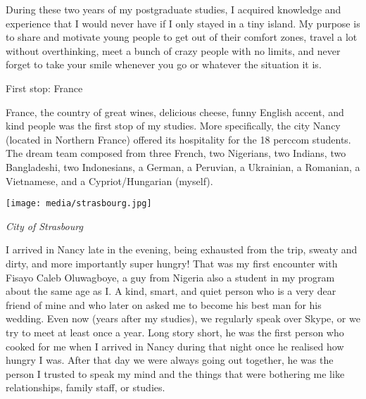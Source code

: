 \documentclass[10pt,a4paper]{article} %
\newcommand{\NewsItem}[1]{ %
\usefont{T1}{fvs}{n}{n} %
\vspace{24pt}\large #1\vspace{3pt} %
\par \normalsize \normalfont}
\begin{document}
\begin{multicols}{3}
During these two years of my postgraduate studies, I acquired knowledge and 
experience that I would never have if I only stayed in a tiny island. 
My purpose is to share and motivate young people to get out of their comfort zones, 
travel a lot without overthinking, meet a bunch of crazy people with no limits, 
and never forget to take your smile whenever you go or whatever the situation it is.

\NewsItem{First stop: France}
France, the country of great wines, delicious cheese, funny English accent, 
and kind people was the first stop of my studies. 
More specifically, the city Nancy (located in Northern France) offered its hospitality 
for the 18 {\sc perccom} students. 
The dream team composed from three French, two Nigerians, two Indians, two Bangladeshi, two 
Indonesians, a German, a Peruvian, a Ukrainian, a Romanian, a Vietnamese, and a 
Cypriot/Hungarian (myself).  

\begin{center}
	\texttt{[image: media/strasbourg.jpg]}
	\par\textit{City of Strasbourg}
\end{center} 

I arrived in Nancy late in the evening, being exhausted from the trip, sweaty and 
dirty, and more importantly super hungry! 
That was my first encounter with Fisayo Caleb Oluwagboye, a guy from Nigeria also 
a student in my program about the same age as I. 
A kind, smart, and quiet person who is a very dear friend of mine 
and who later on asked me to become his best man for his wedding.    
Even now (years after my studies), we regularly speak over Skype, or we try to 
meet at least once a year. 
Long story short, he was the first person who cooked for me when I arrived in Nancy 
during that night once he realised how hungry I was. 
After that day we were always going out together, he was the person I trusted to 
speak my mind and the things that were bothering me like relationships, family staff, 
or studies. 


\end{multicols}
\end{document}
